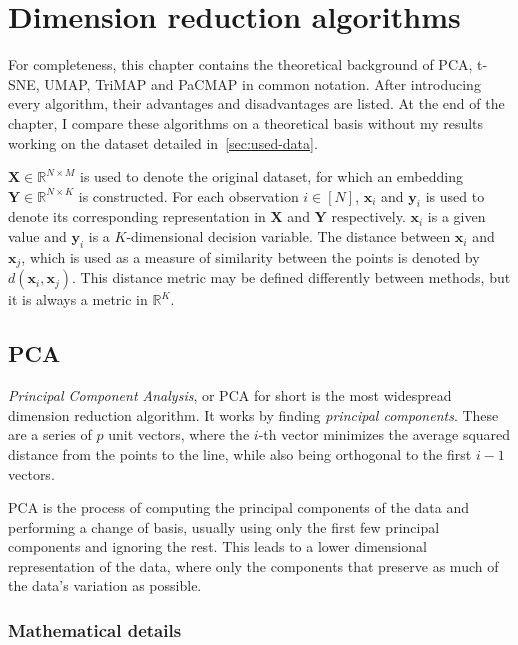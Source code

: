 \chapter{Dimension reduction algorithms}\label{ch:dimension-reduction-algorithms}

For completeness, this chapter contains the theoretical background of PCA, t-SNE, UMAP, TriMAP and PaCMAP in common notation. After introducing every algorithm, their advantages and disadvantages are listed. At the end of the chapter, I compare these algorithms on a theoretical basis without my results working on the dataset detailed in~\ref{sec:used-data}.

$\mathbf{X} \in \mathbb{R}^{N\times M}$ is used to denote the original dataset, for which an embedding $\mathbf{Y} \in \mathbb{R}^{N\times K}$ is constructed. For each observation $i \in [N]$, $\mathbf{x}_i$ and $\mathbf{y}_i$ is used to denote its corresponding representation in $\mathbf{X}$ and $\mathbf{Y}$ respectively. $\mathbf{x}_i$ is a given value and $\mathbf{y}_i$ is a $K$-dimensional decision variable. The distance between $\mathbf{x}_i$ and $\mathbf{x}_j$, which is used as a measure of similarity between the points is denoted by $d(\mathbf{x}_i, \mathbf{x}_j)$. This distance metric may be defined differently between methods, but it is always a metric in $\mathbb{R}^{K}$.

\section{PCA}\label{sec:pca}

\textit{Principal Component Analysis}\cite{bib:pca}, or PCA for short is the most widespread dimension reduction algorithm. It works by finding \textit{principal components}. These are a series of $p$ unit vectors, where the $i$-th vector minimizes the average squared distance from the points to the line, while also being orthogonal to the first $i - 1$ vectors.

PCA is the process of computing the principal components of the data and performing a change of basis, usually using only the first few principal components and ignoring the rest. This leads to a lower dimensional representation of the data, where only the components that preserve as much of the data's variation as possible.

\subsection{Mathematical details}\label{subsec:mathematical-details}

